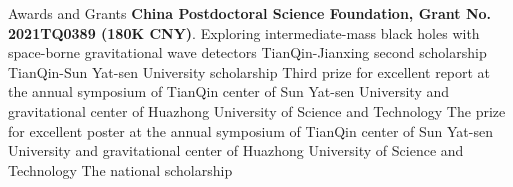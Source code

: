 \begin{rubric}{Awards and Grants}
    \entry*[2021-2023] \textbf{China Postdoctoral Science Foundation, Grant No. 2021TQ0389 (180K CNY)}. Exploring
    intermediate-mass black holes with space-borne gravitational wave detectors 
%
    \entry*[2020] TianQin-Jianxing second scholarship
    \entry*[2019] TianQin-Sun Yat-sen University scholarship
    \entry*[2019] Third prize for excellent report at the annual symposium of TianQin center of Sun Yat-sen University and
    gravitational center of Huazhong University of Science and Technology 
    \entry*[2018] The prize for excellent poster at the annual symposium of TianQin center of Sun Yat-sen University and
    gravitational center of Huazhong University of Science and Technology 
    \entry*[2015] The national scholarship
\end{rubric}
